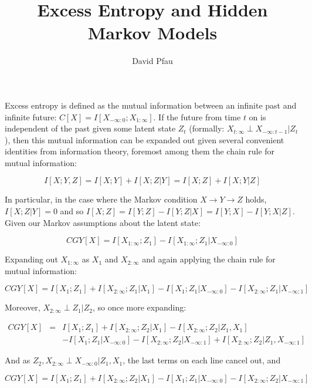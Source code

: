 \documentclass[11pt]{article}
\title{Excess Entropy and Hidden Markov Models}
\author{David Pfau}
\newcommand{\C}{CGY}
\begin{document}
\maketitle

Excess entropy is defined as the mutual information between an infinite past and infinite future: $C[X] = I[X_{-\infty:0};X_{1:\infty}]$.  If the future from time $t$ on is independent of the past given some latent state $Z_t$ (formally: $X_{t:\infty} \perp X_{-\infty:t-1} | Z_t$), then this mutual information can be expanded out given several convenient identities from information theory, foremost among them the chain rule for mutual information:

\[
I[X;Y,Z] = I[X;Y] + I[X;Z|Y] = I[X;Z] + I[X;Y|Z]
\]

In particular, in the case where the Markov condition $X\rightarrow Y\rightarrow Z$ holds, $I[X;Z|Y] = 0$ and so $I[X;Z] = I[Y;Z] - I[Y;Z|X] = I[Y;X] - I[Y;X|Z]$.  Given our Markov assumptions about the latent state:

\[
\C[X] = I[X_{1:\infty};Z_1] - I[X_{1:\infty};Z_1|X_{-\infty:0}]
\]

Expanding out $X_{1:\infty}$ as $X_1$ and $X_{2:\infty}$ and again applying the chain rule for mutual information:

\[
\C[X] = I[X_1;Z_1] + I[X_{2:\infty};Z_1|X_1] - I[X_1;Z_1|X_{-\infty:0}] - I[X_{2:\infty};Z_1|X_{-\infty:1}]
\]

Moreover, $X_{2:\infty} \perp Z_1 | Z_2$, so once more expanding:

\begin{eqnarray*}
\C[X] & = & I[X_1;Z_1] + I[X_{2:\infty};Z_2|X_1] - I[X_{2:\infty};Z_2|Z_1,X_1] \\
& & - I[X_1;Z_1|X_{-\infty:0}] - I[X_{2:\infty};Z_2|X_{-\infty:1}] + I[X_{2:\infty};Z_2|Z_1,X_{-\infty:1}]
\end{eqnarray*}

And as $Z_2, X_{2:\infty} \perp X_{-\infty:0} | Z_1,X_1$, the last terms on each line cancel out, and 

\[
\C[X] = I[X_1;Z_1] + I[X_{2:\infty};Z_2|X_1] - I[X_1;Z_1|X_{-\infty:0}] - I[X_{2:\infty};Z_2|X_{-\infty:1}] 
\]
\end{document}
